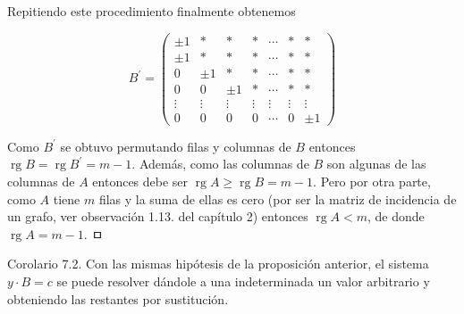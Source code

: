 \documentclass[10pt]{article}
\begin{document}
Repitiendo este procedimiento finalmente obtenemos

$$
B^{\prime}=\left(\begin{array}{ccccccc} 
\pm 1 & * & * & * & \cdots & * & * \\
\pm 1 & * & * & * & \cdots & * & * \\
0 & \pm 1 & * & * & \cdots & * & * \\
0 & 0 & \pm 1 & * & \cdots & * & * \\
\vdots & \vdots & \vdots & \vdots & \vdots & \vdots & \vdots \\
0 & 0 & 0 & 0 & \cdots & 0 & \pm 1
\end{array}\right)
$$

Como $B^{\prime}$ se obtuvo permutando filas y columnas de $B$ entonces $\operatorname{rg} B=\operatorname{rg} B^{\prime}=m-1$. Además, como las columnas de $B$ son algunas de las columnas de $A$ entonces debe ser $\operatorname{rg} A \geq \operatorname{rg} B=m-1$. Pero por otra parte, como $A$ tiene $m$ filas y la suma de ellas es cero (por ser la matriz de incidencia de un grafo, ver observación 1.13. del capítulo 2) entonces $\operatorname{rg} A<m$, de donde $\operatorname{rg} A=m-1$. ㅁ

Corolario 7.2. Con las mismas hipótesis de la proposición anterior, el sistema $y \cdot B=c$ se puede resolver dándole a una indeterminada un valor arbitrario y obteniendo las restantes por sustitución.
\end{document}
